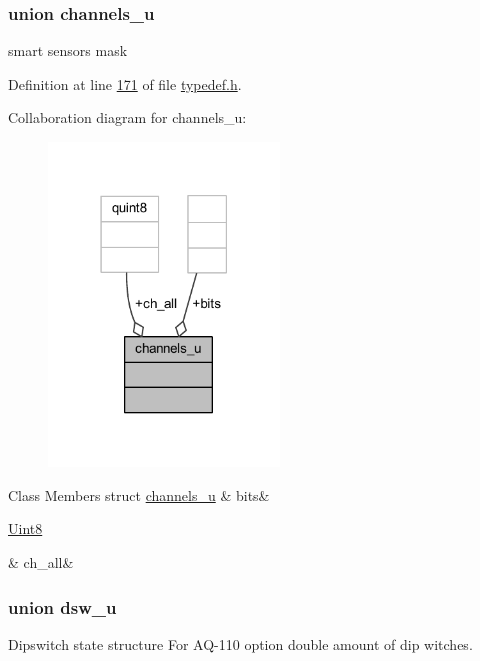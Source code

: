 \subsubsection{union channels\+\_\+u}
smart sensors mask 

Definition at line \hyperlink{a00001_source_l00171}{171} of file \hyperlink{a00001_source}{typedef.\+h}.



Collaboration diagram for channels\+\_\+u\+:
\nopagebreak
\begin{figure}[H]
\begin{center}
\leavevmode
\includegraphics[width=174pt]{d3/d42/a00235}
\end{center}
\end{figure}
\begin{DoxyFields}{Class Members}
\hypertarget{a00001_acbbe8e08ae3cbbb91b66c729c567d15a}{struct \hyperlink{a00001_d4/de8/a00061}{channels\+\_\+u}}\label{a00001_acbbe8e08ae3cbbb91b66c729c567d15a}
&
bits&
\\
\hline

\hypertarget{a00001_afe2b57d7cb6f97e4f0b55c42925ad914}{\hyperlink{a00001_a979e3e23b9a449e69ab6a8a83b6042f8}{Uint8}}\label{a00001_afe2b57d7cb6f97e4f0b55c42925ad914}
&
ch\+\_\+all&
\\
\hline

\end{DoxyFields}
\label{de/de1/a00065}
\hypertarget{a00001_de/de1/a00065}{}
\subsubsection{union dsw\+\_\+u}
Dipswitch state structure For A\+Q-\/110 option double amount of dip witches. 

